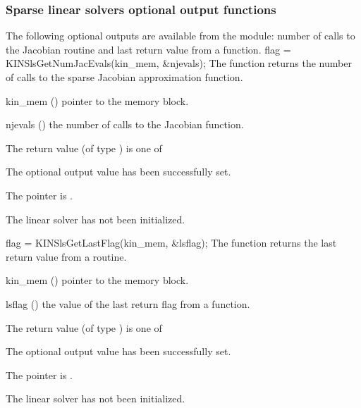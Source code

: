 \subsubsection{Sparse linear solvers optional output functions}\label{sss:optout_sls}
The following optional outputs are available from the {\kinsls} module:
number of calls to the Jacobian routine and last return value from a
{\kinsls} function. 
{
  flag = KINSlsGetNumJacEvals(kin\_mem, \&njevals);
}
{
  The function  returns the
  number of calls to the sparse Jacobian approximation function.
}
{
  \begin{args}
  \item[kin\_mem] ()
    pointer to the {\kinsol} memory block.
  \item[njevals] ()
    the number of calls to the Jacobian function.
  \end{args}
}
{
  The return value  (of type ) is one of
  \begin{args}
  \item[\Id{KINSLS\_SUCCESS}] 
    The optional output value has been successfully set.
  \item[\Id{KINSLS\_MEM\_NULL}]
    The  pointer is .
  \item[\Id{KINSLS\_LMEM\_NULL}]
    The {\kinsls} linear solver has not been initialized.
  \end{args}
}
{}
{
  flag = KINSlsGetLastFlag(kin\_mem, \&lsflag);
}
{
  The function  returns the
  last return value from a {\kinsls} routine. 
}
{
  \begin{args}
  \item[kin\_mem] ()
    pointer to the {\kinsol} memory block.
  \item[lsflag] ()
    the value of the last return flag from a {\kinsls} function.
  \end{args}
}
{
  The return value  (of type ) is one of
  \begin{args}
  \item[\Id{KINSLS\_SUCCESS}] 
    The optional output value has been successfully set.
  \item[\Id{KINSLS\_MEM\_NULL}]
    The  pointer is .
  \item[\Id{KINSLS\_LMEM\_NULL}]
    The {\kinsls} linear solver has not been initialized.
  \end{args}
}

